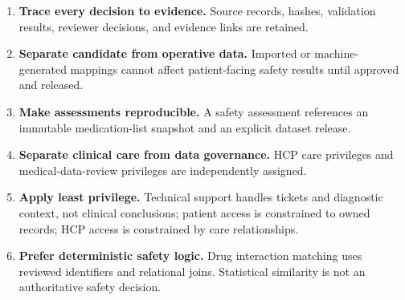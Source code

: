\begin{enumerate}
  \item \textbf{Trace every decision to evidence.} Source records, hashes, validation results, reviewer decisions, and evidence links are retained.
  \item \textbf{Separate candidate from operative data.} Imported or machine-generated mappings cannot affect patient-facing safety results until approved and released.
  \item \textbf{Make assessments reproducible.} A safety assessment references an immutable medication-list snapshot and an explicit dataset release.
  \item \textbf{Separate clinical care from data governance.} HCP care privileges and medical-data-review privileges are independently assigned.
  \item \textbf{Apply least privilege.} Technical support handles tickets and diagnostic context, not clinical conclusions; patient access is constrained to owned records; HCP access is constrained by care relationships.
  \item \textbf{Prefer deterministic safety logic.} Drug interaction matching uses reviewed identifiers and relational joins. Statistical similarity is not an authoritative safety decision.
\end{enumerate}

